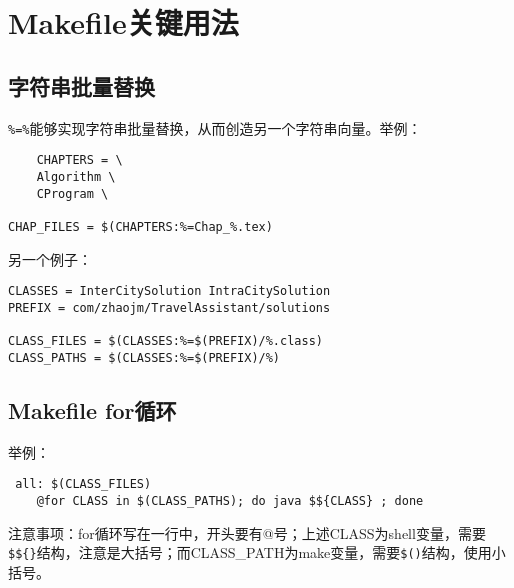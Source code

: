 
\section{Makefile关键用法}

\subsection{字符串批量替换}
\verb|%=%|能够实现字符串批量替换，从而创造另一个字符串向量。举例：
\begin{verbatim}
    CHAPTERS = \
    Algorithm \
    CProgram \

CHAP_FILES = $(CHAPTERS:%=Chap_%.tex)
\end{verbatim}

另一个例子：
\begin{verbatim}
CLASSES = InterCitySolution IntraCitySolution
PREFIX = com/zhaojm/TravelAssistant/solutions

CLASS_FILES = $(CLASSES:%=$(PREFIX)/%.class)
CLASS_PATHS = $(CLASSES:%=$(PREFIX)/%)
\end{verbatim}

\subsection{Makefile for循环}
举例：
\begin{verbatim}
 all: $(CLASS_FILES)
	@for CLASS in $(CLASS_PATHS); do java $${CLASS} ; done
\end{verbatim}
注意事项：for循环写在一行中，开头要有@号；上述CLASS为shell变量，需要\verb|$${}|结构，注意是大括号；而CLASS\_PATH为make变量，需要\verb|$()|结构，使用小括号。







